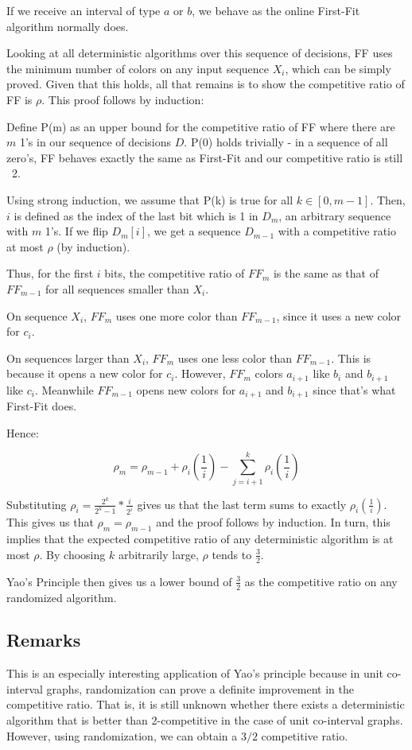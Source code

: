If we receive an interval of type $a$ or $b$, we behave as the online First-Fit algorithm normally does.

Looking at all deterministic algorithms over this sequence of decisions, FF uses the minimum number of colors on any input sequence $X_i$, which  can be simply proved.  Given that this holds, all that remains is to show the competitive ratio of FF is $\rho$.  This proof follows by induction:

Define P(m) as an upper bound for the competitive ratio of FF where there are $m$ 1's in our sequence of decisions $D$.  P(0) holds trivially - in a sequence of all zero's, FF behaves exactly the same as First-Fit and our competitive ratio is still ~2.

Using strong induction, we assume that P(k) is true for all $k \in [0,m-1]$.  Then, $i$ is defined as the index of the last bit which is 1 in $D_m$, an arbitrary sequence with $m$ 1's.  If we flip $D_m[i]$, we get a sequence $D_{m-1}$ with a competitive ratio at most $\rho$ (by induction).

Thus, for the first $i$ bits, the competitive ratio of $FF_m$ is the same as that of $FF_{m-1}$ for all sequences smaller than $X_i$. 

On sequence $X_i$, $FF_m$ uses one more color than $FF_{m-1}$, since it uses a new color for $c_i$.

On sequences larger than $X_i$, $FF_m$ uses one less color than $FF_{m-1}$. This is because it opens a new color for $c_i$. However, $FF_m$ colors $a_{i+1}$ like $b_i$ and $b_{i+1}$ like $c_i$. Meanwhile $FF_{m-1}$ opens new colors for $a_{i+1}$ and $b_{i+1}$ since that's what First-Fit does. 

Hence:

\[\rho_m = \rho_{m-1} + \rho_i(\frac{1}{i}) - \sum_{j=i+1}^k \rho_i(\frac{1}{i})\]

Substituting $\rho_i = \frac{2^k}{2^k-1}*\frac{i}{2^i}$ gives us that the last term sums to exactly $\rho_i(\frac{1}{i})$.  This gives us that $\rho_m = \rho_{m-1}$ and the proof follows by induction.  In turn, this implies that the expected competitive ratio of any deterministic algorithm is at most $\rho$. By choosing $k$ arbitrarily large, $\rho$ tends to $\frac{3}{2}$. 

Yao's Principle then gives us a lower bound of $\frac{3}{2}$ as the competitive ratio on any randomized algorithm.
\subsection{Remarks}
This is an especially interesting application of Yao's principle because in unit co-interval graphs, randomization can prove a definite improvement in the competitive ratio. That is, it is still unknown whether there exists a deterministic algorithm that is better than 2-competitive in the case of unit co-interval graphs. However, using randomization, we can obtain a $3/2$ competitive ratio.

